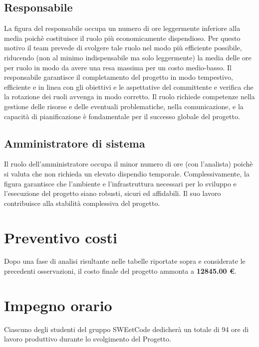 \documentclass{article}
\begin{document}
\subsection{Responsabile}
La figura del responsabile occupa un numero di ore leggermente inferiore alla media poichè costituisce il ruolo più economicamente dispendioso. Per questo motivo il team prevede di svolgere tale ruolo nel modo più efficiente possibile, riducendo (non al minimo indispensabile ma solo leggermente) la media delle ore per ruolo in modo da avere una resa massima per un costo medio-basso. Il responsabile garantisce il completamento del progetto  in modo tempestivo, efficiente e in linea con gli obiettivi e le aspettative del committente e verifica che la rotazione dei ruoli avvenga in modo corretto. Il ruolo richiede competenze nella gestione delle risorse e delle eventuali problematiche, nella comunicazione, e la capacità di pianificazione è fondamentale per il successo globale del progetto. 

\subsection{Amministratore di sistema}
Il ruolo dell'amministratore occupa il minor numero di ore (con l'analista) poichè si valuta che non richieda un elevato dispendio temporale. Complessivamente, la figura garantisce che l'ambiente e l'infrastruttura necessari per lo sviluppo e l'esecuzione del progetto siano robusti, sicuri ed affidabili. Il suo lavoro contribuisce alla stabilità complessiva del progetto.

\section{Preventivo costi}
Dopo una fase di analisi risultante nelle tabelle riportate sopra e considerate le precedenti osservazioni, il costo finale del progetto ammonta a \textbf{12845.00 €}.
\section{Impegno orario}

Ciascuno degli studenti del gruppo SWEetCode dedicherà un totale di 94 ore di lavoro produttivo durante lo svolgimento del Progetto.
\end{document}
